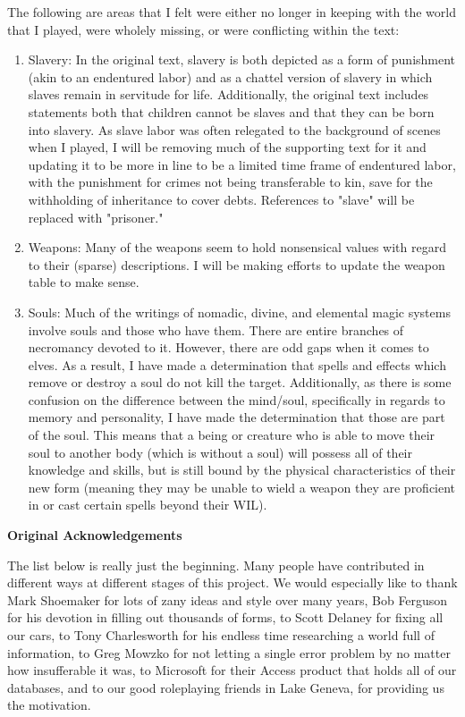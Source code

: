 The following are areas that I felt were either no longer in keeping with the world that I played, were wholely missing, or were conflicting within the text:
\begin{enumerate}
\item Slavery: In the original text, slavery is both depicted as a form of punishment (akin to an endentured labor) and as a chattel version of slavery in which slaves remain in servitude for life. Additionally, the original text includes statements both that children cannot be slaves and that they can be born into slavery. As slave labor was often relegated to the background of scenes when I played, I will be removing much of the supporting text for it and updating it to be more in line to be a limited time frame of endentured labor, with the punishment for crimes not being transferable to kin, save for the withholding of inheritance to cover debts. References to "slave" will be replaced with "prisoner."
\item Weapons: Many of the weapons seem to hold nonsensical values with regard to their (sparse) descriptions. I will be making efforts to update the weapon table to make sense.
\item Souls: Much of the writings of nomadic, divine, and elemental magic systems involve souls and those who have them. There are entire branches of necromancy devoted to it. However, there are odd gaps when it comes to elves. As a result, I have made a determination that spells and effects which remove or destroy a soul do not kill the target. Additionally, as there is some confusion on the difference between the mind/soul, specifically in regards to memory and personality, I have made the determination that those are part of the soul. This means that a being or creature who is able to move their soul to another body (which is without a soul) will possess all of their knowledge and skills, but is still bound by the physical characteristics of their new form (meaning they may be unable to wield a weapon they are proficient in or cast certain spells beyond their WIL).
\end{enumerate}

\textbf{Original Acknowledgements}

The list below is really just the beginning. Many people have contributed in different ways at different stages of this project. We would especially like to thank Mark Shoemaker for lots of zany ideas and style over many years, Bob Ferguson for his devotion in filling out thousands of forms, to Scott Delaney for fixing all our cars, to Tony Charlesworth for his endless time researching a world full of information, to Greg Mowzko for not letting a single error problem by no matter how insufferable it was, to Microsoft for their Access product that holds all of our databases, and to our good roleplaying friends in Lake Geneva, for providing us the motivation.

